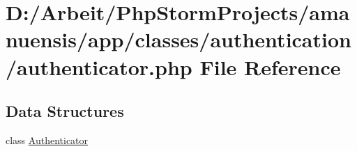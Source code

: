 \hypertarget{authenticator_8php}{}\section{D\+:/\+Arbeit/\+Php\+Storm\+Projects/amanuensis/app/classes/authentication/authenticator.php File Reference}
\label{authenticator_8php}
\subsection*{Data Structures}
\begin{DoxyCompactItemize}
\item 
class \hyperlink{class_authenticator}{Authenticator}
\end{DoxyCompactItemize}
